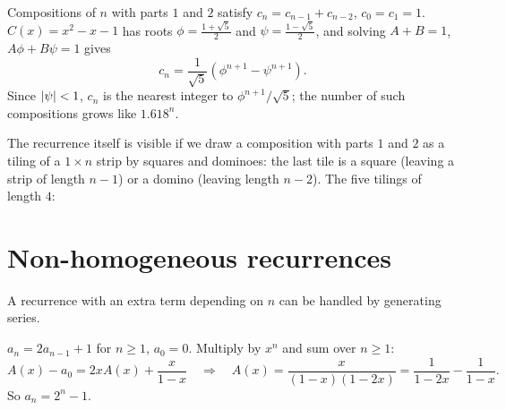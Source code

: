 \begin{example}
Compositions of $n$ with parts $1$ and $2$ satisfy $c_n = c_{n-1} + c_{n-2}$, $c_0 = c_1 = 1$.
$C(x) = x^2 - x - 1$ has roots $\phi = \frac{1+\sqrt5}{2}$ and $\psi = \frac{1-\sqrt5}{2}$, and
solving $A + B = 1$, $A\phi + B\psi = 1$ gives
\[
c_n = \frac{1}{\sqrt5}\left(\phi^{n+1} - \psi^{n+1}\right).
\]
Since $\left\lvert \psi \right\rvert < 1$, $c_n$ is the nearest integer to $\phi^{n+1}/\sqrt5$; the number of such
compositions grows like $1.618^n$.
\end{example}

The recurrence itself is visible if we draw a composition with parts $1$ and $2$ as a tiling
of a $1\times n$ strip by squares and dominoes: the last tile is a square (leaving a strip of
length $n-1$) or a domino (leaving length $n-2$). The five tilings of length $4$:
\begin{center}
\end{center}

\section{Non-homogeneous recurrences}

A recurrence with an extra term depending on $n$ can be handled by generating series.

\begin{example}
$a_n = 2a_{n-1} + 1$ for $n\ge1$, $a_0 = 0$. Multiply by $x^n$ and sum over $n \ge 1$:
\[
A(x) - a_0 = 2xA(x) + \frac{x}{1-x}\quad\Longrightarrow\quad
A(x) = \frac{x}{(1-x)(1-2x)} = \frac{1}{1-2x} - \frac{1}{1-x}.
\]
So $a_n = 2^n - 1$.
\end{example}

